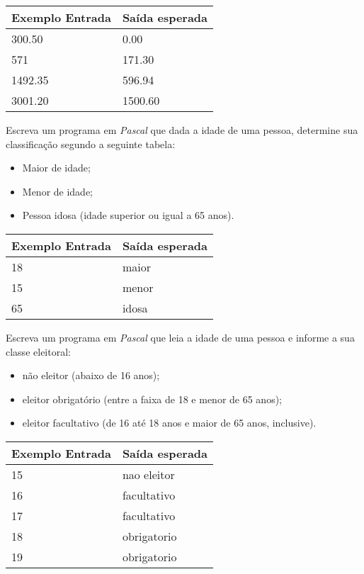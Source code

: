 \begin{center}
\begin{tabular}{|l|l|} \hline
Exemplo Entrada & Saída esperada \\ \hline
300.50                & 0.00                \\ \hline
571                & 171.30               \\ \hline
1492.35                & 596.94               \\ \hline
3001.20               &  1500.60               \\ \hline
\end{tabular}
\end{center}

\item Escreva um programa em \emph{Pascal} que dada a idade de uma pessoa, 
determine sua classificação segundo a seguinte tabela:
\begin{itemize}
\item Maior de idade;
\item Menor de idade;
\item Pessoa idosa (idade superior ou igual a 65 anos).
\end{itemize}

\begin{center}
\begin{tabular}{|l|l|} \hline
Exemplo Entrada & Saída esperada \\ \hline
18                & maior               \\ \hline
15                & menor               \\ \hline
65                & idosa               \\ \hline
\end{tabular}
\end{center}

\item Escreva um programa em \emph{Pascal} que leia a idade de uma pessoa 
e informe a sua classe eleitoral:
\begin{itemize}
\item não eleitor (abaixo de 16 anos);
\item eleitor obrigatório (entre a faixa de 18 e menor de 65 anos);
\item eleitor facultativo (de 16 até 18 anos e maior de 65 anos, inclusive).
\end{itemize}

\begin{center}
\begin{tabular}{|l|l|} \hline
Exemplo Entrada & Saída esperada \\ \hline
15                & nao eleitor               \\ \hline
16                & facultativo               \\ \hline
17                & facultativo               \\ \hline
18                & obrigatorio               \\ \hline
19                & obrigatorio               \\ \hline
\end{tabular}
\end{center}

